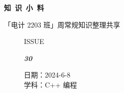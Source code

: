 \documentclass[UTF8]{ctexart}
\newcommand\Black[1]{\textcolor[gray]{0.3}{#1}}
\newcommand\Brown[1]{\textcolor[HTML]{998A4E}{#1}}
\newcommand\IssueNumber{30}
\newcommand\Date{2024-6-8}
\newcommand\Subject{C++ 编程}
\begin{document}
\BgThispage
\begin{center}
\phantom{...}

{\Large\textcolor{brown!40!white}{}}

\vspace{-2em}

{\Huge\bfseries\TitleFont \Black{知\ 识\ 小\ 料}}


\vspace{-0.1cm}
{\footnotesize \Brown{「电计 2203 班」周常规知识整理共享}}
\end{center}

\vspace{-0.5cm}


\begin{figure}[H]
\hspace{1cm}
\begin{minipage}[t]{0.3\textwidth}
\centering
    \Brown{\Genshin ISSUE}

    \vspace{-0.6cm}
    \Huge \Issue\slshape\bfseries\Black{\IssueNumber}
\end{minipage}
\hfill
\begin{minipage}[t]{0.35\textwidth}
\centering
    \Brown{日期：\Date} \\
\vspace{-0.1cm}
    \Brown{学科：\Subject} \\
\end{minipage}
\hspace{0.8cm}
\end{figure}
\end{document}
